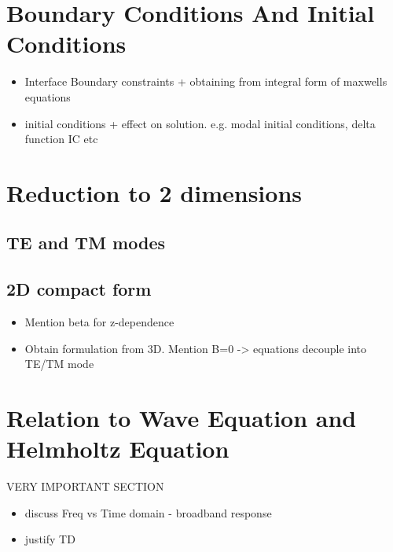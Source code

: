 \section{Boundary Conditions And Initial Conditions}
\begin{itemize}
	\item Interface Boundary constraints + obtaining from integral form of maxwells equations
	\item initial conditions + effect on solution. e.g. modal initial conditions, delta function IC etc
\end{itemize}

% 


\section{Reduction to 2 dimensions}
\subsection{TE and TM modes}
\subsection{2D compact form}
\begin{itemize}
  \item Mention beta for z-dependence
  \item Obtain formulation from 3D. Mention B=0 -> equations decouple into TE/TM mode
\end{itemize}

\section{Relation to Wave Equation and Helmholtz Equation}
VERY IMPORTANT SECTION
\begin{itemize}
  \item discuss Freq vs Time domain - broadband response
  \item justify TD
\end{itemize}